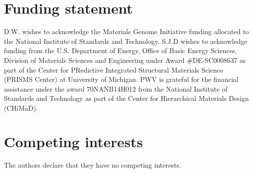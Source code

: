 \documentclass{jors}
\begin{document}
\section*{Funding statement}

D.W. wishes to acknowledge the Materials Genome Initiative funding
allocated to the National Institute of Standards and Technology. S.J.D
wishes to acknowledge funding from the U.S. Department of Energy,
Office of Basic Energy Sciences, Division of Materials Sciences and
Engineering under Award \#DE-SC0008637 as part of the Center for
PRedictive Integrated Structural Materials Science (PRISMS Center) at
University of Michigan. PWV is grateful for the financial assistance
under the award 70NANB14H012 from the National Institute of Standards
and Technology as part of the Center for Hierarchical Materials Design
(CHiMaD).

\section*{Competing interests}

The authors declare that they have no competing interests.

\printbibliography
\end{document}
